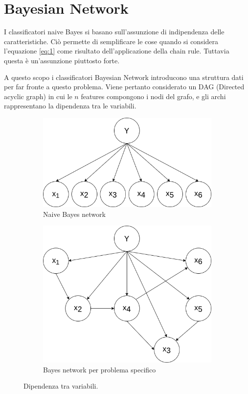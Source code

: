 \documentclass[oneside]{book}
\begin{document}
\section{Bayesian Network}
I classificatori naive Bayes si basano sull'assunzione di indipendenza delle caratteristiche. Ciò permette di semplificare le cose quando si considera l'equazione \eqref{eq:1} come risultato dell'applicazione della chain rule.
Tuttavia questa è un'assunzione piuttosto forte.

A questo scopo i classificatori Bayesian Network introducono una struttura dati per far fronte a questo problema. Viene pertanto considerato un DAG (Directed acyclic graph) in cui le $n$ features compongono i nodi del grafo, e gli archi rappresentano la dipendenza tra le variabili.

\begin{figure}[!h]
	\centering
	\begin{subfigure}[b]{0.4\textwidth}
		\centering
		\includegraphics[width=\linewidth]{assets/naive-bayes.png}
		\caption{Naive Bayes network}
		\label{fig:naive-bayes}
	\end{subfigure}
	\hfill
	\begin{subfigure}[b]{0.4\textwidth}
	\centering
		\includegraphics[width=\linewidth]{assets/bayes-network.png}
		\caption{Bayes network per problema specifico}
		\label{fig:naive-bayes}
	\end{subfigure}
	\caption{Dipendenza tra variabili.}
\end{figure}
\end{document}

